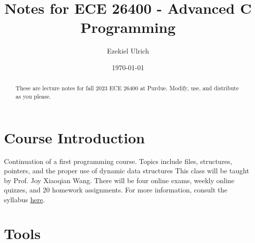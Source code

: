 \documentclass[nobib]{tufte-handout}
\title{Notes for ECE 26400 - Advanced C Programming}
\author[Ezekiel Ulrich]{Ezekiel Ulrich}
\date{\today}  %
\begin{document}
\maketitle

\begin{abstract}
These are lecture notes for fall 2023 ECE 26400 at Purdue. Modify, use, and distribute as you please.
\end{abstract}

\tableofcontents


\section{Course Introduction}
Continuation of a first programming course. 
Topics include files, structures, pointers, and the proper use of dynamic data structures
This class will be taught by Prof. Joy Xiaoqian Wang. There will be four online exams, 
weekly online quizzes, and 20 homework assignments. For more information, 
consult the syllabus \href{https://github.com/ezekielulrich/Notes/blob/d83855d25b40c224ce70b0b46ae6a86adc5a783f/ECE%20264%20Fall%202023%20Syllabus.pdf}{here}.

\pagebreak

\section{Tools}
\end{document}
